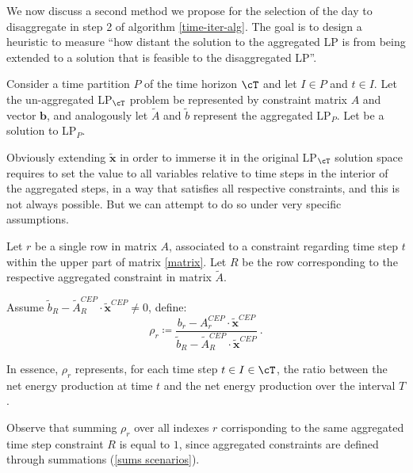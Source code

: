 We now discuss a second method we propose for the selection of the day to disaggregate in step 2 of algorithm \ref{time-iter-alg}. 
The goal is to design a heuristic to measure ``how distant the solution to the aggregated LP is from being extended to a solution that is feasible to the disaggregated LP''.

Consider a time partition $P$ of the time horizon $\cT$ and let \(I \in P\) and \(t \in I\).
Let the un-aggregated LP$_{\cT}$ problem be represented by constraint matrix $A$ and vector $\mathbf{b}$, and analogously let $\tilde{A}$ and $\tilde{b}$ represent the aggregated LP$_P$.
Let  be a solution to LP$_P$.

Obviously extending \(\tilde{\mathbf{x}}\) in order to immerse it in the original LP{$_\cT$} solution space requires to set the value to all variables relative to time steps in the interior of the aggregated steps, in a way that satisfies all respective constraints, and this is not always possible.
But we can attempt to do so under very specific assumptions. %

\begin{definition}[Rho]\label{def rho}
Let $r$ be a single row in matrix $A$, associated to a constraint regarding time step $t$ within the upper part of matrix \ref{matrix}. 
Let $R$ be the row corresponding to the respective aggregated constraint in matrix $\tilde{A}$.

Assume \(\tilde{b}_R - \tilde{A}_R^{CEP}\cdot \tilde{\mathbf{x}}^{CEP} \neq 0\), define:
\[\rho_r \coloneqq \frac{b_r - A_r^{CEP} \cdot \tilde{\mathbf{x}}^{CEP}}{\tilde{b}_R - \tilde{A}_R^{CEP}\cdot \tilde{\mathbf{x}}^{CEP}}\  .\]
\end{definition}
In essence, \(\rho_r\) represents, for each time step \(t \in I \in \cT\), the ratio between the net energy production at time \(t\) and the net energy production over the interval \(T\).

Observe that summing $\rho_r$ over all indexes $r$ corrisponding to the same aggregated time step constraint $R$ is equal to $1$, since aggregated constraints are defined through summations (\ref{sums scenarios}).


